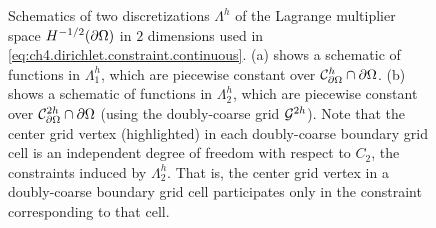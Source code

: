 \setlength{\figurewidth}{0.50\textwidth}
\begin{figure}[htb]
\centering
{}
\caption{Schematics of two discretizations $\Lambda^h$ of the Lagrange multiplier space $H^{-1/2}(\partial\Omega)$ in $2$ dimensions used in \eqref{eq:ch4.dirichlet.constraint.continuous}. (a) shows a schematic of functions in $\Lambda^h_1$, which are piecewise constant over $\mathcal{C}^h_{\partial\Omega} \cap \partial\Omega$. (b) shows a schematic of functions in $\Lambda^h_2$, which are piecewise constant over $\mathcal{C}^{2h}_{\partial\Omega} \cap \partial\Omega$ (using the doubly-coarse grid $\mathcal{G}^{2h}$). Note that the center grid vertex (highlighted) in each doubly-coarse boundary grid cell is an independent degree of freedom with respect to $C_2$, the constraints induced by $\Lambda^h_2$. That is, the center grid vertex in a doubly-coarse boundary grid cell participates only in the constraint corresponding to that cell.}
\label{fig:ch4.lambdah}
\end{figure}

